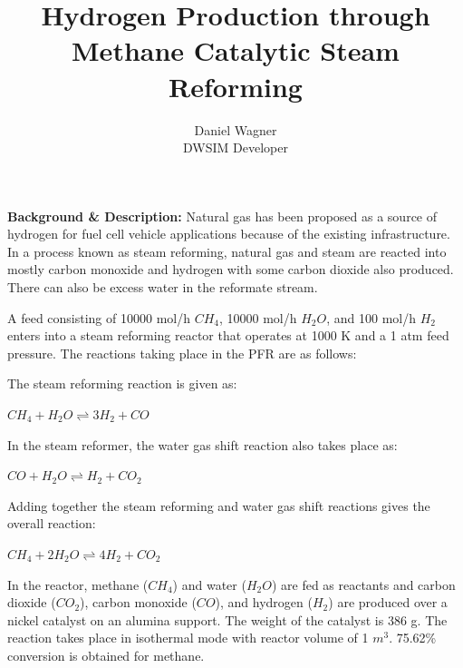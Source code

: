 \documentclass[a4paper,12pt]{article}
\title{Hydrogen Production through Methane Catalytic Steam Reforming}
\author{Daniel Wagner \\ DWSIM Developer}
\date{}
\begin{document}
\maketitle

\noindent \textbf{Background \& Description:}
\newline Natural gas has been proposed as a source of hydrogen for fuel cell vehicle applications because of the existing infrastructure. In a process known as steam reforming, natural gas and steam are reacted into mostly carbon monoxide and hydrogen with some carbon dioxide also produced. There can also be excess water in the reformate stream.

\bigskip A feed consisting of 10000 mol/h $CH_4$, 10000 mol/h $H_2O$, and 100 mol/h $H_2$ enters into a steam reforming reactor that operates at 1000 K and a 1 atm feed pressure. The reactions taking place in the PFR are as follows:

\noindent The steam reforming reaction is given as:

\begin{center} 
\noindent $CH_4 + H_2O \rightleftharpoons 3 H_2 + CO$ 
\end{center}				      

\noindent In the steam reformer, the water gas shift reaction also takes place as: 
\begin{center} 
\noindent $CO + H_2O \rightleftharpoons H_2 + CO_2$ 
\end{center}						           

\noindent Adding together the steam reforming and water gas shift reactions gives the overall reaction:  

\begin{center} 
\noindent $CH_4 + 2 H_2O \rightleftharpoons 4 H_2 + CO_2$ 
\end{center}

\bigskip In the reactor, methane ($CH_4$) and water ($H_2O$) are fed as reactants and carbon dioxide ($CO_2$), carbon monoxide ($CO$), and hydrogen ($H_2$) are produced over a nickel catalyst on an alumina support. The weight of the catalyst is 386 g. The reaction takes place in isothermal mode with reactor volume of 1 $m^3$. 75.62\% conversion is obtained for methane.
\end{document}

